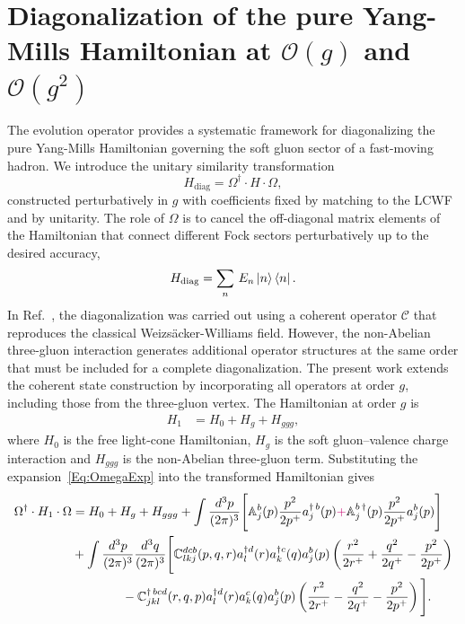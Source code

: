 \documentclass[a4paper,11pt]{article}
\def\mf#1{\mathbb{#1}}
\begin{document}
\section{Diagonalization of the pure Yang-Mills Hamiltonian at $\mathcal{O}(g)$ and $\mathcal{O}(g^{2})$}\label{sec:diagonal}
The evolution operator provides a systematic framework for diagonalizing the pure Yang-Mills Hamiltonian governing the soft gluon sector of a fast-moving hadron. We introduce the unitary similarity transformation
\begin{equation}
    H_{\text{diag}} = \Omega^{\dagger}\cdot H \cdot \Omega,
\end{equation}
constructed perturbatively in $g$ with coefficients fixed by matching to the LCWF and by unitarity. The role of $\Omega$ is to cancel the off-diagonal matrix elements of the Hamiltonian that connect different Fock sectors perturbatively up to the desired accuracy,
\begin{equation}
    H_{\text{diag}} = \sum_{n}\,E_{n}\ket{n}\bra{n}.
\end{equation}
In Ref.~\cite{kovner2019entanglement}, the diagonalization was carried out using a coherent operator $\mathcal{C}$ that reproduces the classical Weizsäcker-Williams field. However, the non-Abelian three-gluon interaction generates additional operator structures at the same order that must be included for a complete diagonalization. The present work extends the coherent state construction by incorporating all operators at order $g$, including those from the three-gluon vertex. The Hamiltonian at order $g$ is
\begin{align}
    H_{1} & = H_{0} + H_{g} + H_{ggg},
\end{align}
where $H_{0}$ is the free light-cone Hamiltonian, $H_{g}$ is the soft gluon--valence charge interaction and $H_{ggg}$ is the non-Abelian three-gluon term. Substituting the expansion~\eqref{Eq:OmegaExp} into the transformed Hamiltonian gives
\begin{align}
    \Omega^{\dagger}\cdot H_{1} \cdot \Omega & = H_{0}+H_{g}+ H_{ggg}
    + \int \frac{d^{3}p}{(2\pi)^{3}}\Bigg[ \mf{A}^{b}_{j}(p)\frac{p^{2}}{2p^{+}} a^{\dagger\, b}_{j}(p) {\color{chg}+} \mf{A}^{b\, \dagger}_{j}(p)\frac{p^{2}}{2p^{+}} a^{b}_{j}(p)\Bigg]\notag \\
    & + \int \frac{d^{3}p}{(2\pi)^{3}} \frac{d^{3}q}{(2\pi)^{3}} \Bigg[\mf{C}^{dcb}_{lkj}(p,q,r) a^{\dagger d}_{l}(r)  a^{\dagger c}_{k}(q)  a^{b}_{j}(p)\left(\frac{r^{2}}{2r^{+}}+\frac{q^{2}}{2q^{+}}-\frac{p^{2}}{2p^{+}}\right) \notag \\
    & \qquad\qquad -  \mf{C}^{\dagger\, bcd}_{jkl}(r,q,p) a^{\dagger d}_{l}(r) a^{c}_{k}(q) a^{b}_{j}(p)\left(\frac{r^{2}}{2r^{+}}-\frac{q^{2}}{2q^{+}}-\frac{p^{2}}{2p^{+}}\right)\Bigg].
\end{align}
\end{document}
